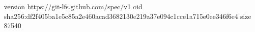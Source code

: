 version https://git-lfs.github.com/spec/v1
oid sha256:df2f405ba1e5c85a2e460acad3682130e219a37e094c1cce1a715e0ee346f6e4
size 87540
